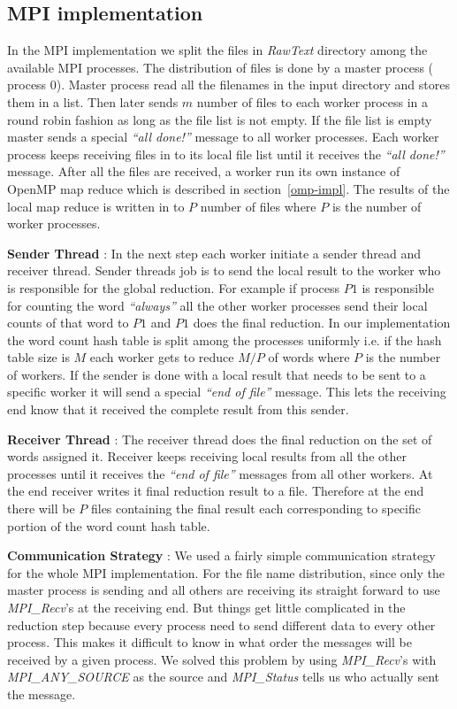 \documentclass[12pt]{article}
\begin{document}
\subsection{MPI implementation}
In the MPI implementation we split the files in {\em RawText } directory among the available MPI processes. The distribution of files is done by a master process ( process $0$).
Master process read all the filenames in the input directory and stores them in a list. Then later sends $m$  number of files to each worker process in a round robin fashion as long as the file
list is not empty. If the file list is empty master sends a special {\em ``all done!''} message to all worker processes. Each worker process keeps receiving files in to its local file list until
it receives the {\em``all done!''} message. After all the files are received, a worker run its own instance of OpenMP map reduce which is described in section~\ref{omp-impl}. The results of the
local map reduce is written in to $P$ number of files where $P$ is the number of worker processes. 

\noindent \textbf{Sender Thread} : In the next step each worker initiate a sender thread and receiver thread. Sender threads job is
to send the local result to the worker who is responsible for the global reduction. For example if process $P1$ is responsible for counting the word {\em ``always''} all the other worker processes send their
local counts of that word to $P1$ and $P1$ does the final reduction. In our implementation the word count hash table is split among the processes uniformly i.e. if the hash table size is $M$ each worker gets 
to reduce $M/P$ of words where $P$ is the number of workers. If the sender is done with a local result that needs to be sent to a specific worker it will send a special {\em ``end of file''} message. This
lets the receiving end know that it received the complete result from this sender. 

\noindent \textbf{Receiver Thread} : The receiver thread does the final reduction on the set of words assigned it. Receiver keeps receiving local results from all the other processes until it 
receives the {\em ``end of file''} messages from all 
other workers. At the end receiver writes it final reduction result to a file. Therefore at the end there will be $P$ files containing the final result each corresponding to specific portion of the word 
count hash table. 

\noindent \textbf{Communication Strategy} : We used a fairly simple communication strategy for the whole MPI implementation. For the file name distribution, since only the master process is sending and all others are 
receiving its straight forward to use {\em MPI\_Recv}'s at the receiving end. But things get little complicated in the reduction step because every process need to send different data to every other process. This makes 
it difficult to know in what order the messages will be received by a given process. We solved this problem by using {\em MPI\_Recv}'s with {\em MPI\_ANY\_SOURCE} as the source and {\em MPI\_Status} tells us who actually sent 
the message.
\end{document}
